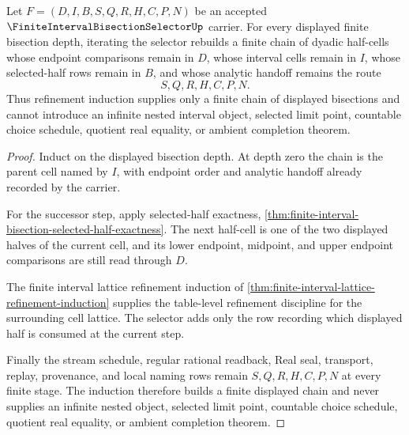 \begin{theorem}
\label{thm:finite-interval-bisection-refinement-induction}
Let $F=(D,I,B,S,Q,R,H,C,P,N)$ be an accepted $\FiniteIntervalBisectionSelectorUp$ carrier. For every displayed finite bisection depth, iterating the selector rebuilds a finite chain of dyadic half-cells whose endpoint comparisons remain in $D$, whose interval cells remain in $I$, whose selected-half rows remain in $B$, and whose analytic handoff remains the route
$$
S,Q,R,H,C,P,N .
$$
Thus refinement induction supplies only a finite chain of displayed bisections and cannot introduce an infinite nested interval object, selected limit point, countable choice schedule, quotient real equality, or ambient completion theorem.
\end{theorem}
\begin{proof}
Induct on the displayed bisection depth. At depth zero the chain is the parent cell named by $I$, with endpoint order and analytic handoff already recorded by the carrier.

For the successor step, apply selected-half exactness, \autoref{thm:finite-interval-bisection-selected-half-exactness}. The next half-cell is one of the two displayed halves of the current cell, and its lower endpoint, midpoint, and upper endpoint comparisons are still read through $D$.

The finite interval lattice refinement induction of \autoref{thm:finite-interval-lattice-refinement-induction} supplies the table-level refinement discipline for the surrounding cell lattice. The selector adds only the row recording which displayed half is consumed at the current step.

Finally the stream schedule, regular rational readback, Real seal, transport, replay, provenance, and local naming rows remain $S,Q,R,H,C,P,N$ at every finite stage. The induction therefore builds a finite displayed chain and never supplies an infinite nested object, selected limit point, countable choice schedule, quotient real equality, or ambient completion theorem.
\end{proof}

